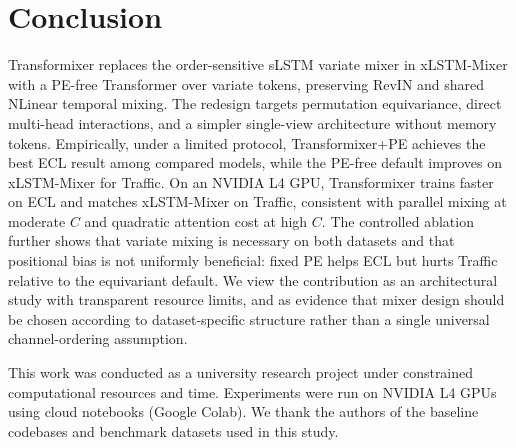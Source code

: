 \documentclass{article}
\begin{document}
\section{Conclusion}
\label{sec:conclusion}

Transformixer replaces the order-sensitive sLSTM variate mixer in xLSTM-Mixer with a PE-free Transformer over variate tokens, preserving RevIN and shared NLinear temporal mixing.
The redesign targets permutation equivariance, direct multi-head interactions, and a simpler single-view architecture without memory tokens.
Empirically, under a limited protocol, Transformixer+PE achieves the best ECL result among compared models, while the PE-free default improves on xLSTM-Mixer for Traffic.
On an NVIDIA L4 GPU, Transformixer trains faster on ECL and matches xLSTM-Mixer on Traffic, consistent with parallel mixing at moderate $C$ and quadratic attention cost at high $C$.
The controlled ablation further shows that variate mixing is necessary on both datasets and that positional bias is not uniformly beneficial: fixed PE helps ECL but hurts Traffic relative to the equivariant default.
We view the contribution as an architectural study with transparent resource limits, and as evidence that mixer design should be chosen according to dataset-specific structure rather than a single universal channel-ordering assumption.

\begin{ack}
This work was conducted as a university research project under constrained computational resources and time.
Experiments were run on NVIDIA L4 GPUs using cloud notebooks (Google Colab).
We thank the authors of the baseline codebases and benchmark datasets used in this study.
\end{ack}



\end{document}
